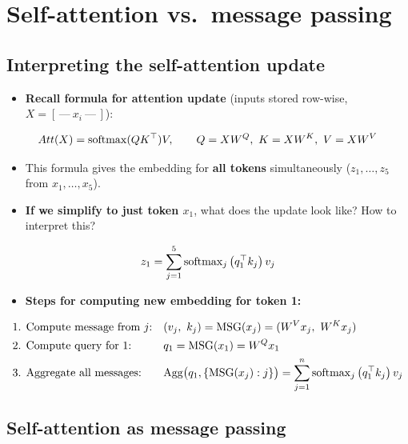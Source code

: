 \section{Self-attention vs.\ message passing}\label{sec:lec08-mp}

\subsection{Interpreting the self-attention update}\label{sec:lec08-interp}

\begin{itemize}
  \item \textbf{Recall formula for attention update} (inputs stored row-wise,
    $X=[\,\text{---}\ x_i\ \text{---}\,]$):
\end{itemize}
\begin{equation}\label{eq:lec08-att}
  Att(X) = \operatorname{softmax}(QK^{\top})V,\qquad Q = XW^Q,\ K = XW^K,\ V = XW^V
\end{equation}
\begin{itemize}
  \item This formula gives the embedding for \textbf{all tokens} simultaneously
    ($z_1,\dots,z_5$ from $x_1,\dots,x_5$).
  \item \textbf{If we simplify to just token $x_1$}, what does the update look
    like? How to interpret this?
\end{itemize}
\begin{equation}\label{eq:lec08-z1}
  z_1 = \sum_{j=1}^{5}\operatorname{softmax}_j\big(q_1^{\top} k_j\big)\,v_j
\end{equation}
\begin{itemize}
  \item \textbf{Steps for computing new embedding for token 1:}
\end{itemize}
\begin{align}
  &\text{1. Compute message from $j$:} && (v_j,\ k_j) = \operatorname{MSG}(x_j) = (W^V x_j,\ W^K x_j)
    \label{eq:lec08-msg}\\
  &\text{2. Compute query for 1:} && q_1 = \operatorname{MSG}(x_1) = W^Q x_1 \label{eq:lec08-query}\\
  &\text{3. Aggregate all messages:} && \mathrm{Agg}\big(q_1,\{\operatorname{MSG}(x_j): j\}\big)
    = \sum_{j=1}^{n}\operatorname{softmax}_j\big(q_1^{\top} k_j\big)\,v_j \label{eq:lec08-agg}
\end{align}

\subsection{Self-attention as message passing}\label{sec:lec08-samp}

